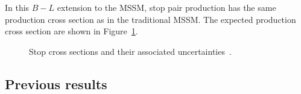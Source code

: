 In this $B-L$ extension to the MSSM, stop pair production has the same
production cross section as in the traditional MSSM.
The expected production cross section are shown in Figure~\ref{fig:stop_xsec}.

\begin{figure}[ht]
  \caption{Stop cross sections and their associated
    uncertainties~\cite{Beenakker:1997ut,Beenakker:2010nq,Beenakker:2011fu}.
  }
  \label{fig:stop_xsec}
\end{figure}

% 
% 
% 

\FloatBarrier
\subsection{Previous results}

